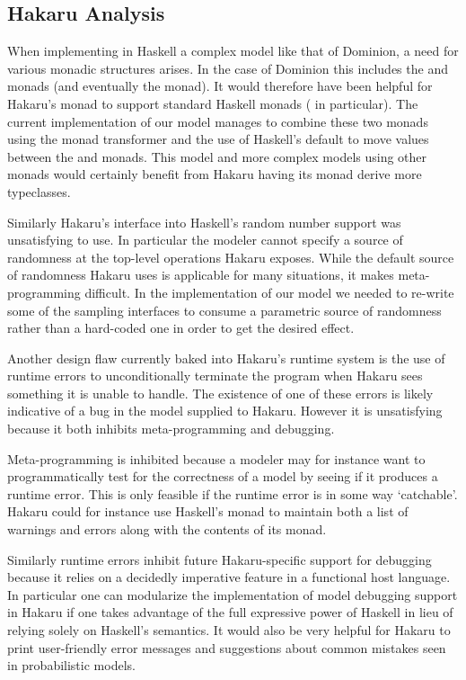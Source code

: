 \subsection{Hakaru Analysis} \label{sec:hakaru-analysis}

When implementing in Haskell a complex model like that of Dominion, a
need for various monadic structures arises. In the case of Dominion
this includes the  and  monads (and eventually
the  monad). It would therefore have been helpful for Hakaru's
 monad to support standard Haskell monads ( in
particular). The current implementation of our model manages to combine
these two monads using the  monad transformer and the use
of Haskell's default  to move values between the  and
 monads. This model and more complex models using other
monads would certainly benefit from Hakaru having its 
monad derive more typeclasses.

Similarly Hakaru's interface into Haskell's random number support was
unsatisfying to use. In particular the modeler cannot specify a source
of randomness at the top-level operations Hakaru exposes. While the
default source of randomness Hakaru uses is applicable for many situations,
it makes meta-programming difficult. In the implementation of our model
we needed to re-write some of the sampling interfaces to consume a parametric
source of randomness rather than a hard-coded one in order to get the
desired effect.

Another design flaw currently baked into Hakaru's runtime system is the
use of runtime errors to unconditionally terminate the program when
Hakaru sees something it is unable to handle. The existence of
one of these errors is likely indicative of a bug in the model supplied
to Hakaru. However it is unsatisfying because it both inhibits
meta-programming and debugging.

Meta-programming is inhibited because a modeler may for instance want to
programmatically test for the correctness of a model by seeing if it
produces a runtime error. This is only feasible if the runtime error
is in some way `catchable'. Hakaru could for instance use Haskell's
 monad to maintain both a list of warnings and errors
along with the contents of its  monad.

Similarly runtime errors inhibit future Hakaru-specific support for
debugging because it relies on a decidedly imperative feature in a
functional host language. In particular one can modularize the implementation
of model debugging support in Hakaru if one takes advantage of the full
expressive power of Haskell in lieu of relying solely on Haskell's 
semantics. It would also be very helpful for Hakaru to print user-friendly
error messages and suggestions about common mistakes seen in probabilistic
models.

